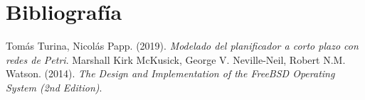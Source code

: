 \section{Bibliografía}

\begin{thebibliography}{9}
     Tomás Turina, Nicolás Papp. (2019). \textit{Modelado del planificador a corto plazo con redes de Petri}.
     Marshall Kirk McKusick, George V. Neville-Neil, Robert N.M. Watson. (2014). \textit{The Design and Implementation of the FreeBSD Operating System (2nd Edition)}.
\end{thebibliography}